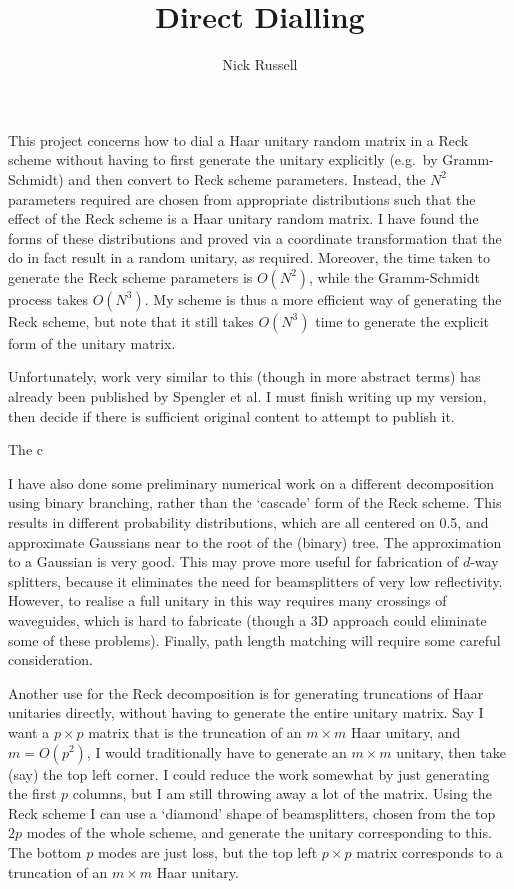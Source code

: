 \documentclass[a4paper]{article}
\title{Direct Dialling}
\author{Nick Russell}
\newcommand{\by}{\times}
\newcommand{\of}[1]{\left(#1\right)}
\newcommand{\bigo}[1]{O\of{#1}}
\begin{document}
\maketitle
This project concerns how to dial a Haar unitary random matrix in a Reck scheme
without having to first generate the unitary explicitly (e.g.\ by Gramm-Schmidt)
and then convert to Reck scheme parameters. Instead, the \( N^{2} \) parameters
required are chosen from appropriate distributions such that the effect of the
Reck scheme is a Haar unitary random matrix. I have found the forms of these
distributions and proved via a coordinate transformation that the do in fact
result in a random unitary, as required. Moreover, the time taken to generate
the Reck scheme parameters is \(\bigo{N^{2}}\), while the Gramm-Schmidt process
takes \(\bigo{N^{3}}\). My scheme is thus a more efficient way of generating the
Reck scheme, but note that it still takes \(\bigo{N^{3}}\) time to generate the
explicit form of the unitary matrix.

Unfortunately, work very similar to this (though in more abstract terms) has
already been published by Spengler et al. I must finish writing up my version,
then decide if there is sufficient original content to attempt to publish it.

The c

I have also done some preliminary numerical work on a different decomposition
using binary branching, rather than the `cascade' form of the Reck scheme. This
results in different probability distributions, which are all centered on 0.5,
and approximate Gaussians near to the root of the (binary) tree. The
approximation to a Gaussian is very good. This may prove more useful for
fabrication of \(d\)-way splitters, because it eliminates the need for
beamsplitters of very low reflectivity. However, to realise a full unitary in
this way requires many crossings of waveguides, which is hard to fabricate
(though a 3D approach could eliminate some of these problems). Finally, path
length matching will require some careful consideration.

Another use for the Reck decomposition is for generating truncations of
Haar unitaries directly, without having to generate the entire unitary matrix.
Say I want a \(p \by p\) matrix that is the truncation of an \(m \by m\) Haar
unitary, and \(m = \bigo{p^{2}}\), I would traditionally have to generate an \(m
\by m\) unitary, then take (say) the top left corner. I could reduce the work
somewhat by just generating the first \(p\) columns, but I am still throwing
away a lot of the matrix. Using the Reck scheme I can use a `diamond' shape of
beamsplitters, chosen from the top \(2p\) modes of the whole scheme, and
generate the unitary corresponding to this. The bottom \(p\) modes are just
loss, but the top left \(p \by p\) matrix corresponds to a truncation of an \(m
\by m\) Haar unitary.
\end{document}
